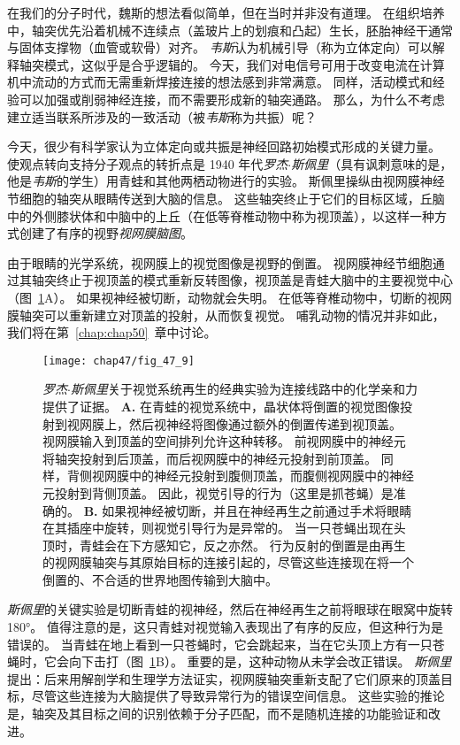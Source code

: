 在我们的分子时代，魏斯的想法看似简单，但在当时并非没有道理。
在组织培养中，轴突优先沿着机械不连续点（盖玻片上的划痕和凸起）生长，胚胎神经干通常与固体支撑物（血管或软骨）对齐。
\textit{韦斯}认为机械引导（称为立体定向）可以解释轴突模式，这似乎是合乎逻辑的。
今天，我们对电信号可用于改变电流在计算机中流动的方式而无需重新焊接连接的想法感到非常满意。
同样，活动模式和经验可以加强或削弱神经连接，而不需要形成新的轴突通路。
那么，为什么不考虑建立适当联系所涉及的一致活动（被\textit{韦斯}称为共振）呢？


今天，很少有科学家认为立体定向或共振是神经回路初始模式形成的关键力量。
使观点转向支持分子观点的转折点是 1940 年代\textit{罗杰$\cdot$斯佩里}（具有讽刺意味的是，他是\textit{韦斯}的学生）用青蛙和其他两栖动物进行的实验。
斯佩里操纵由视网膜神经节细胞的轴突从眼睛传送到大脑的信息。
这些轴突终止于它们的目标区域，丘脑中的外侧膝状体和中脑中的上丘（在低等脊椎动物中称为视顶盖），以这样一种方式创建了有序的视野\textit{视网膜脑图}。


由于眼睛的光学系统，视网膜上的视觉图像是视野的倒置。
视网膜神经节细胞通过其轴突终止于视顶盖的模式重新反转图像，视顶盖是青蛙大脑中的主要视觉中心（图~\ref{fig:47_9}A）。
如果视神经被切断，动物就会失明。
在低等脊椎动物中，切断的视网膜轴突可以重新建立对顶盖的投射，从而恢复视觉。
哺乳动物的情况并非如此，我们将在第~\ref{chap:chap50}~章中讨论。


\begin{figure}[htbp]
	\centering
	\texttt{[image: chap47/fig\_47\_9]}
	\caption{\textit{罗杰$\cdot$斯佩里}关于视觉系统再生的经典实验为连接线路中的化学亲和力提供了证据。
		\textbf{A.} 在青蛙的视觉系统中，晶状体将倒置的视觉图像投射到视网膜上，然后视神经将图像通过额外的倒置传递到视顶盖。
		视网膜输入到顶盖的空间排列允许这种转移。
		前视网膜中的神经元将轴突投射到后顶盖，而后视网膜中的神经元投射到前顶盖。
		同样，背侧视网膜中的神经元投射到腹侧顶盖，而腹侧视网膜中的神经元投射到背侧顶盖。
		因此，视觉引导的行为（这里是抓苍蝇）是准确的。
		\textbf{B.} 如果视神经被切断，并且在神经再生之前通过手术将眼睛在其插座中旋转，则视觉引导行为是异常的。
		当一只苍蝇出现在头顶时，青蛙会在下方感知它，反之亦然。
		行为反射的倒置是由再生的视网膜轴突与其原始目标的连接引起的，尽管这些连接现在将一个倒置的、不合适的世界地图传输到大脑中。}
	\label{fig:47_9}
\end{figure}


\textit{斯佩里}的关键实验是切断青蛙的视神经，然后在神经再生之前将眼球在眼窝中旋转 180°。
值得注意的是，这只青蛙对视觉输入表现出了有序的反应，但这种行为是错误的。
当青蛙在地上看到一只苍蝇时，它会跳起来，当在它头顶上方有一只苍蝇时，它会向下击打（图~\ref{fig:47_9}B）。
重要的是，这种动物从未学会改正错误。
\textit{斯佩里}提出：后来用解剖学和生理学方法证实，视网膜轴突重新支配了它们原来的顶盖目标，尽管这些连接为大脑提供了导致异常行为的错误空间信息。
这些实验的推论是，轴突及其目标之间的识别依赖于分子匹配，而不是随机连接的功能验证和改进。


